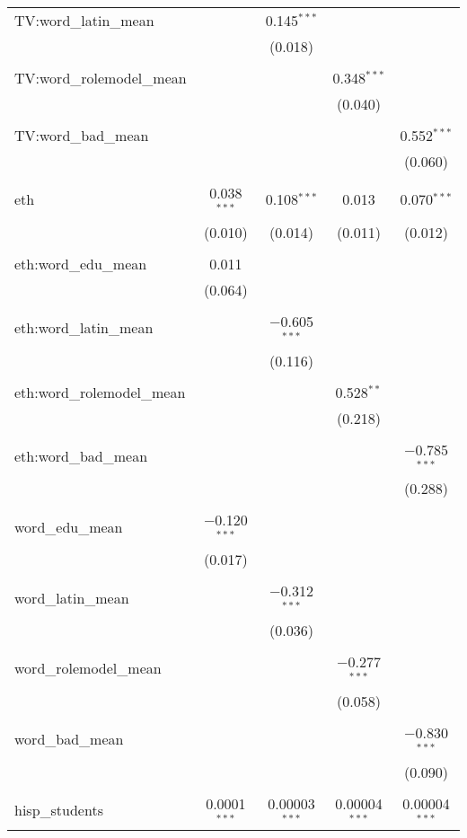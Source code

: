 \begin{table}[!htbp]
\begin{tabular}{@{\extracolsep{-2pt}}lcccc}
 TV:word\_latin\_mean &  & 0.145$^{***}$ &  &  \\ 
  &  & (0.018) &  &  \\ 
  & & & & \\ 
 TV:word\_rolemodel\_mean &  &  & 0.348$^{***}$ &  \\ 
  &  &  & (0.040) &  \\ 
  & & & & \\ 
 TV:word\_bad\_mean &  &  &  & 0.552$^{***}$ \\ 
  &  &  &  & (0.060) \\ 
  & & & & \\ 
 eth & 0.038$^{***}$ & 0.108$^{***}$ & 0.013 & 0.070$^{***}$ \\ 
  & (0.010) & (0.014) & (0.011) & (0.012) \\ 
  & & & & \\ 
 eth:word\_edu\_mean & 0.011 &  &  &  \\ 
  & (0.064) &  &  &  \\ 
  & & & & \\ 
 eth:word\_latin\_mean &  & $-$0.605$^{***}$ &  &  \\ 
  &  & (0.116) &  &  \\ 
  & & & & \\ 
 eth:word\_rolemodel\_mean &  &  & 0.528$^{**}$ &  \\ 
  &  &  & (0.218) &  \\ 
  & & & & \\ 
 eth:word\_bad\_mean &  &  &  & $-$0.785$^{***}$ \\ 
  &  &  &  & (0.288) \\ 
  & & & & \\ 
 word\_edu\_mean & $-$0.120$^{***}$ &  &  &  \\ 
  & (0.017) &  &  &  \\ 
  & & & & \\ 
 word\_latin\_mean &  & $-$0.312$^{***}$ &  &  \\ 
  &  & (0.036) &  &  \\ 
  & & & & \\ 
 word\_rolemodel\_mean &  &  & $-$0.277$^{***}$ &  \\ 
  &  &  & (0.058) &  \\ 
  & & & & \\ 
 word\_bad\_mean &  &  &  & $-$0.830$^{***}$ \\ 
  &  &  &  & (0.090) \\ 
  & & & & \\ 
 hisp\_students & 0.0001$^{***}$ & 0.00003$^{***}$ & 0.00004$^{***}$ & 0.00004$^{***}$ \\ 

\end{tabular}
\end{table}
